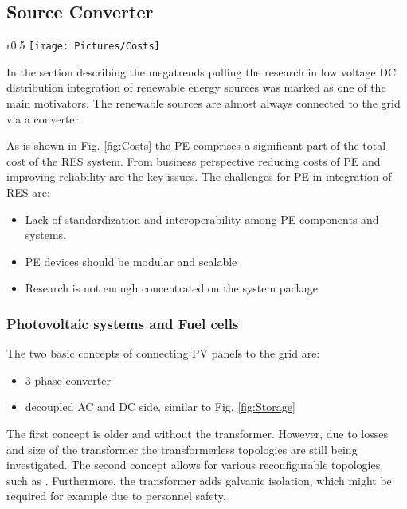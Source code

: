 \documentclass[]{scrartcl}
\begin{document}
	\subsection{Source Converter}
	

\begin{wrapfigure}{r}{0.5\textwidth}
	\vspace{-20pt}
	\centering
	\texttt{[image: Pictures/Costs]}
	\vspace{-5pt}
	\caption{Cost of PE in RES.\cite{Chakraborty2009}}
	\vspace{-10pt}
	\label{fig:Costs}
\end{wrapfigure}


In the section describing the megatrends pulling the research in low voltage DC distribution integration of renewable energy sources was marked as one of the main motivators. The renewable sources are almost always connected to the grid via a converter. 

As is shown in Fig. \ref{fig:Costs} the PE comprises a significant part of the total cost of the RES system. From business perspective reducing costs of PE and improving reliability are the key issues. The challenges for PE in integration of RES are\cite{Chakraborty2009}:

\begin{itemize}
	\item Lack of standardization and interoperability among PE components and systems. 
	\item PE devices should be modular and scalable
	\item Research is not enough concentrated on the system package
\end{itemize}

\subsubsection{Photovoltaic systems and Fuel cells}
The two basic concepts of connecting PV panels to the grid are:
\begin{itemize}
	\item 3-phase converter
	\item decoupled AC and DC side, similar to Fig. \ref{fig:Storage}
\end{itemize} 
The first concept is older and without the transformer. However, due to losses and size of the transformer the transformerless topologies are still being investigated\cite{Liserre2010}. The second concept allows for various reconfigurable topologies, such as \cite{Kim2013}. Furthermore, the transformer adds galvanic isolation, which might be required for example due to personnel safety. 
\end{document}
